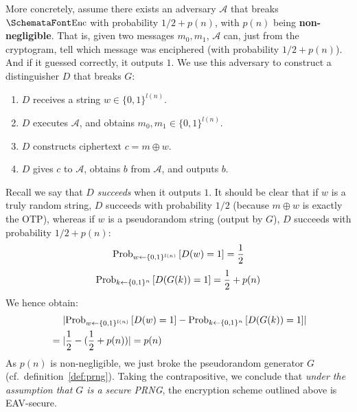   More concretely, assume there exists an adversary $\mathcal{A}$ that breaks $\myemph{Enc}$ with probability $1/2 + p(n)$, with $p(n)$ being \textbf{non-negligible}. That is, given two messages $m_0, m_1$, $\mathcal{A}$ can, just from the cryptogram, tell which message was enciphered (with probability $1/2 + p(n)$). And if it guessed correctly, it outputs $1$. We use this adversary to construct a distinguisher $D$ that breaks $G$:
  \begin{enumerate}
    \item $D$ receives a string $w\in \{0, 1\}^{l(n)}$.
    \item $D$ executes $\mathcal{A}$, and obtains $m_0, m_1\in \{0, 1\}^{l(n)}$.
    \item $D$ constructs ciphertext $c = m \oplus w$.
    \item $D$ gives $c$ to $\mathcal{A}$, obtains $b$ from $\mathcal{A}$, and outputs $b$.
  \end{enumerate}
  Recall we say that $D$ \emph{succeeds} when it outputs $1$. It should be clear that if $w$ is a truly random string, $D$ succeeds with probability $1/2$ (because $m \oplus w$ is exactly the OTP), whereas if $w$ is a pseudorandom string (output by $G$), $D$ succeeds with probability $1/2 + p(n)$:
  \begin{equation}
    \textup{Prob}_{w \leftarrow \{0, 1\}^{l(n)}}\left[D(w) = 1\right] = \frac{1}{2}
  \end{equation}
  \begin{equation}
    \textup{Prob}_{k \leftarrow \{0, 1\}^{n}}\left[D(G(k)) = 1\right] = \frac{1}{2} + p(n)
  \end{equation}
  We hence obtain:
  \begin{align}
    &\phantom{{}={}}\abs{\textup{Prob}_{w \leftarrow \{0, 1\}^{l(n)}}\left[D(w) = 1\right] - \textup{Prob}_{k \leftarrow \{0, 1\}^{n}}\left[D(G(k)) = 1\right]} \\
    &= \abs{\frac{1}{2} - \parens{\frac{1}{2} + p(n)}} = p(n)
  \end{align}
  As $p(n)$ is non-negligible, we just broke the pseudorandom generator $G$ (cf.\ definition~\ref{def:prng}). Taking the contrapositive, we conclude that \emph{under the assumption that $G$ is a secure PRNG}, the encryption scheme outlined above is EAV-secure.

